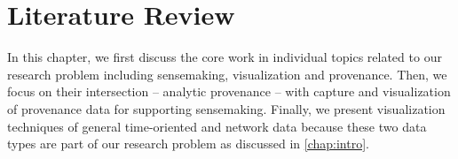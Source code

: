\chapter{Literature Review}
\label{chap:review}

\graphicspath{{Chapter2/figures/}}

In this chapter, we first discuss the core work in individual topics related to our research problem including sensemaking, visualization and provenance. Then, we focus on their intersection -- analytic provenance -- with capture and visualization of provenance data for supporting sensemaking. Finally, we present visualization techniques of general time-oriented and network data because these two data types are part of our research problem as discussed in \autoref{chap:intro}.

% 

%
%
%
%
